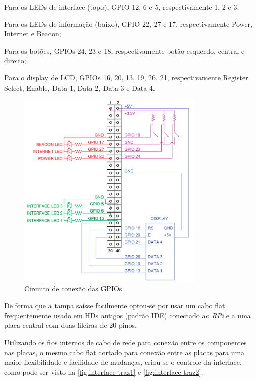 \begin{alineas}
	\item Para os LEDs de interface (topo), GPIO 12, 6 e 5, respectivamente 1, 2 e 3;
	\item Para os LEDs de informação (baixo), GPIO 22, 27 e 17, respectivamente Power, Internet e Beacon;
	\item Para os botões, GPIOs 24, 23 e 18, respectivamente botão esquerdo, central e direito;
	\item Para o display de LCD, GPIOs 16, 20, 13, 19, 26, 21, respectivamente Register Select, Enable, Data 1, Data 2, Data 3 e Data 4.
\end{alineas}

\begin{figure}[htb]
	\caption{\label{fig:pinout-gpio}Circuito de conexão das GPIOs}
	\begin{center}
		\includegraphics[width=0.8\textwidth]{img/pinout-gpio.png}
	\end{center}
\end{figure}

De forma que a tampa saísse facilmente optou-se por usar um cabo flat frequentemente usado em HDs antigos (padrão IDE) conectado ao \textit{RPi} e a uma placa central com duas fileiras de 20 pinos.

Utilizando os fios internos de cabo de rede para conexão entre os componentes nas placas, o mesmo cabo flat cortado para conexão entre as placas para uma maior flexibilidade e facilidade de mudanças, criou-se o controle da interface, como pode ser visto na \autoref{fig:interface-traz1} e \autoref{fig:interface-traz2}.

